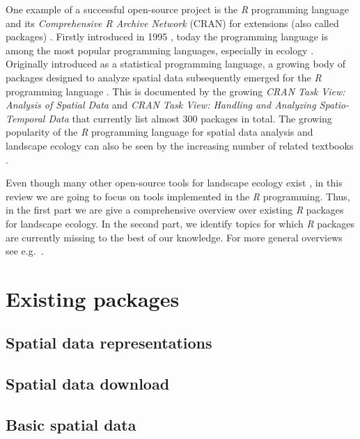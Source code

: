 \documentclass[smallextended]{svjour3}       %
\begin{document}
One example of a successful open-source project is the \emph{R}
programming language and its \emph{Comprehensive R Archive Network}
(CRAN) for extensions (also called packages) \cite{RCoreTeam2019}.
Firstly introduced in 1995 \cite{Smith2016}, today the programming
language is among the most popular programming languages, especially in
ecology \cite{Lai2019}. Originally introduced as a statistical
programming language, a growing body of packages designed to analyze
spatial data subsequently emerged for the \emph{R} programming language
\cite{Bivand2006}. This is documented by the growing \emph{CRAN Task
View: Analysis of Spatial Data} \cite{Bivand2019a} and \emph{CRAN Task
View: Handling and Analyzing Spatio-Temporal Data} \cite{Pebesma2020}
that currently list almost 300 packages in total. The growing popularity
of the \emph{R} programming language for spatial data analysis and
landscape ecology can also be seen by the increasing number of related
textbooks \cite{Fletcher2019,Lovelace2019,Pebesma2019a}.

Even though many other open-source tools for landscape ecology exist
\cite{QGISDevelopmentTeam2016,GRASSDevelopmentTeam2017,Porta2017}, in
this review we are going to focus on tools implemented in the \emph{R}
programming. Thus, in the first part we are give a comprehensive
overview over existing \emph{R} packages for landscape ecology. In the
second part, we identify topics for which \emph{R} packages are
currently missing to the best of our knowledge. For more general
overviews see
e.g.~\cite{Jolma2008,Steiniger2009,Steiniger2009a,Istvan2012}.

\hypertarget{sec:existing_packages}{%
\section{Existing packages}\label{sec:existing_packages}}

\hypertarget{spatial-data-representations}{%
\subsection{Spatial data
representations}\label{spatial-data-representations}}

\hypertarget{spatial-data-download}{%
\subsection{Spatial data download}\label{spatial-data-download}}

\hypertarget{basic-spatial-data}{%
\subsection{Basic spatial data}\label{basic-spatial-data}}
\end{document}
